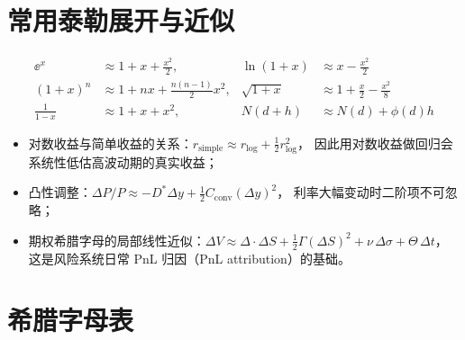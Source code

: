\section{常用泰勒展开与近似}

\begin{align}
  \ee^{x} &\approx 1+x+\frac{x^2}{2}, &
  \ln(1+x) &\approx x-\frac{x^2}{2} \\
  (1+x)^{n} &\approx 1+nx+\frac{n(n-1)}{2}x^2, &
  \sqrt{1+x} &\approx 1+\frac{x}{2}-\frac{x^2}{8} \\
  \frac{1}{1-x} &\approx 1+x+x^2, &
  N(d+h) &\approx N(d)+\phi(d)h
\end{align}

\begin{appbox}[用这些近似做什么]
\begin{itemize}[leftmargin=1.4em]
  \item 对数收益与简单收益的关系：$r_{\text{simple}}\approx r_{\text{log}}+\tfrac12 r_{\text{log}}^2$，
        因此用对数收益做回归会系统性低估高波动期的真实收益；
  \item 凸性调整：$\Delta P/P\approx -D^*\Delta y+\frac12 C_{\text{conv}}(\Delta y)^2$，
        利率大幅变动时二阶项不可忽略；
  \item 期权希腊字母的局部线性近似：$\Delta V\approx \Delta\cdot\Delta S+\frac12\Gamma(\Delta S)^2+\nu\,\Delta\sigma+\Theta\,\Delta t$，
        这是风险系统日常 PnL 归因（PnL attribution）的基础。
\end{itemize}
\end{appbox}

\section{希腊字母表}

